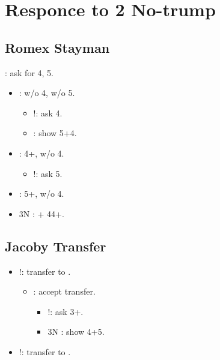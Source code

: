 \documentclass[12pt,twoside,a5paper]{report}%
\begin{document}
\chapter*{Responce to 2 No-trump}
	
	\section*{Romex Stayman}
		 : ask for 4\he{}, 5\sp{}.
		\begin{itemize}
		\renewcommand{\labelitemi}{--}
			\item {} : w/o 4\he{}, w/o 5\sp{}.
			\begin{itemize}
			\renewcommand{\labelitemi}{--}
				\item {}!: ask 4\sp{}.
				\item {} : show 5\sp{}+4\he{}.
			\end{itemize}
			\item {} : 4+\he{}, w/o 4\sp{}.
			\begin{itemize}
			\renewcommand{\labelitemi}{--}
				\item {}!: ask 5\he{}.
			\end{itemize}
			\item {} : 5+\sp{}, w/o 4\he{}.
			\item 3N : \he{}+\sp{} 44+.
		\end{itemize}
		
	\section*{Jacoby Transfer}
	\begin{itemize}
		\renewcommand{\labelitemi}{}
		\item {}!: transfer to .
		\begin{itemize}
		\renewcommand{\labelitemi}{--}
			\item {} : accept transfer.
			\begin{itemize}
			\renewcommand{\labelitemi}{--}	
				\item {}!: ask 3+\he{}.
				\item 3N : show 4\sp{}+5\he{}.
			\end{itemize}
		\end{itemize}
		\item {}!: transfer to .
	\end{itemize}
\end{document}
